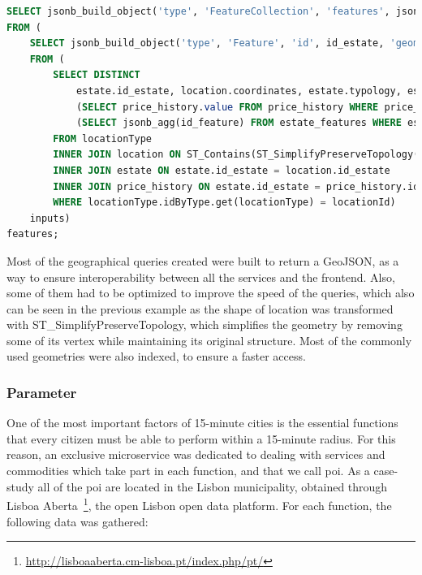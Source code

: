 \begin{lstlisting}[float, language=SQL, label={lst:geoQueryEstates}, caption={[Example of geographical sql query returning a GeoJSON]{Example of a geographical query used in the project that returns the results formatted into a GeoJSON}}, captionpos=t]
SELECT jsonb_build_object('type', 'FeatureCollection', 'features', jsonb_agg(features.feature)) 
FROM ( 
    SELECT jsonb_build_object('type', 'Feature', 'id', id_estate, 'geometry', ST_AsGeoJSON(coordinates)::jsonb, 'properties', to_jsonb(inputs) - 'id_estate' - 'coordinates') AS feature
	FROM (
	    SELECT DISTINCT 
            estate.id_estate, location.coordinates, estate.typology, estate.living_area, estate.gross_living_area, construction_year,
            (SELECT price_history.value FROM price_history WHERE price_history.id_estate = location.id_estate ORDER BY update_date DESC LIMIT 1),
            (SELECT jsonb_agg(id_feature) FROM estate_features WHERE estate_features.id_estate = estate.id_estate) as features
        FROM locationType 
        INNER JOIN location ON ST_Contains(ST_SimplifyPreserveTopology(locationType.shape, SIMPLIFY_RATIO), location.coordinates)
        INNER JOIN estate ON estate.id_estate = location.id_estate
        INNER JOIN price_history ON estate.id_estate = price_history.id_estate
        WHERE locationType.idByType.get(locationType) = locationId) 
	inputs) 
features;
\end{lstlisting}

Most of the geographical queries created were built to return a GeoJSON, as a way to ensure interoperability between all the services and the frontend. Also, some of them had to be optimized to improve the speed of the queries, which also can be seen in the previous example as the shape of location was transformed with ST\_SimplifyPreserveTopology, which simplifies the geometry by removing some of its vertex while maintaining its original structure. Most of the commonly used geometries were also indexed, to ensure a faster access.

\subsubsection{Parameter}
\label{sss:parameter}

One of the most important factors of 15-minute cities is the essential functions that every citizen must be able to perform within a 15-minute radius. For this reason, an exclusive microservice was dedicated to dealing with services and commodities which take part in each function, and that we call  \acrfull{poi}. As a case-study all of the \acrshort{poi} are located in the Lisbon municipality, obtained through Lisboa Aberta~\footnote{\url{http://lisboaaberta.cm-lisboa.pt/index.php/pt/}}, the open Lisbon open data platform. For each function, the following data was gathered:

